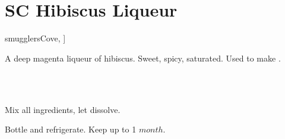 \section{SC Hibiscus Liqueur}\label{hibiscus_liqueur}


\begin{recipestats}[
	servings=16~\fluidounce,
	preptime=5~\minute,
	original=\citeauthor{smugglersCove}~\cite[p.~331]{smugglersCove},
]
\end{recipestats}


\begin{recipeabstract}
	A deep magenta liqueur of hibiscus.
	Sweet, spicy, saturated.
	Used to make .  %
\end{recipeabstract}


\begin{ingredientcolumns}[1]
	\begin{ingredientblock}
		\\
		\\
	\end{ingredientblock}
\end{ingredientcolumns}


\begin{preparation}
	\item Mix all ingredients, let dissolve.
	\item Bottle and refrigerate. Keep up to 1 $month$.
\end{preparation}


\recipeend%
